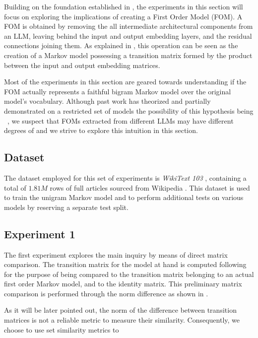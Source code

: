Building on the foundation established in , the experiments in this section will focus on exploring the implications of creating a First Order Model (FOM).
A FOM is obtained by removing the all intermediate architectural components from an LLM, leaving behind the input and output embedding layers, and the residual connections joining them.
As explained in , this operation can be seen as the creation of a Markov model possessing a transition matrix formed by the product between the input and output embedding matrices.

Most of the experiments in this section are geared towards understanding if the FOM actually represents a faithful bigram Markov model over the original model's vocabulary.
Although past work has theorized and partially demonstrated on a restricted set of models the possibility of this hypothesis being ~\cite{elhage2021}, we suspect that FOMs extracted from different LLMs may have different degrees of  and we strive to explore this intuition in this section.

\subsection{Dataset}

The dataset employed for this set of experiments is \emph{WikiText 103} , containing a total of $1.81M$ rows of full articles sourced from Wikipedia .
This dataset is used to train the unigram Markov model and to perform additional tests on various models by reserving a separate test split.

\subsection{Experiment 1}

The first experiment explores the main inquiry by means of direct matrix comparison.
The transition matrix for the model at hand is computed following  for the purpose of being compared to the transition matrix belonging to an actual first order Markov model, and to the identity matrix.
This preliminary matrix comparison is performed through the norm difference as shown in .

As it will be later pointed out, the norm of the difference between transition matrices is not a reliable metric to measure their similarity.
Consequently, we choose to use set similarity metrics to


